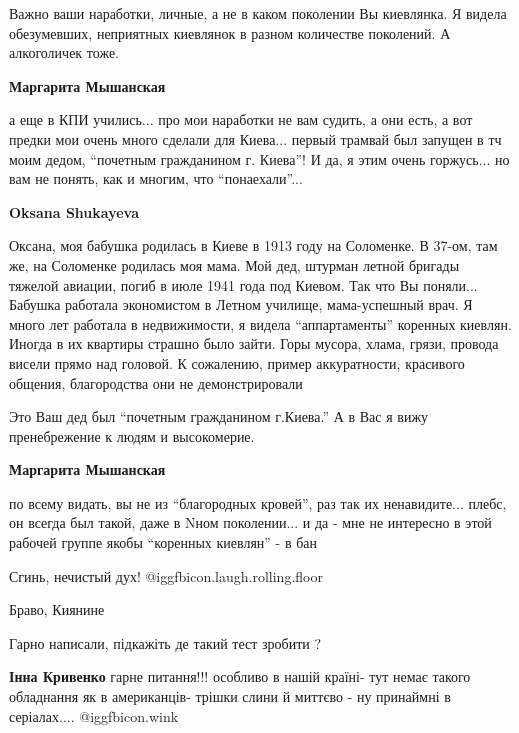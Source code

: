 \begin{itemize}
\begin{itemize}

Важно ваши наработки, личные, а не в каком поколении Вы киевлянка. Я видела
обезумевших, неприятных киевлянок в разном количестве поколений. А алкоголичек
тоже.

\begin{itemize} %
\textbf{Маргарита Мышанская} 

а еще в КПИ учились... про мои наработки не вам судить, а они есть, а вот предки
мои очень много сделали для Киева... первый трамвай был запущен в тч моим
дедом, \enquote{почетным гражданином г. Киева}! И да, я этим очень горжусь... но вам не
понять, как и многим, что \enquote{понаехали}...


\textbf{Oksana Shukayeva} 

Оксана, моя бабушка родилась в Киеве в 1913 году на Соломенке. В 37-ом, там же,
на Соломенке родилась моя мама. Мой дед, штурман летной бригады тяжелой
авиации, погиб в июле 1941 года под Киевом. Так что Вы поняли... Бабушка
работала экономистом в Летном училище, мама-успешный врач. Я много лет работала
в недвижимости, я видела \enquote{аппартаменты} коренных киевлян. Иногда в их
квартиры страшно было зайти. Горы мусора, хлама, грязи, провода висели прямо
над головой. К сожалению, пример аккуратности, красивого общения, благородства
они не демонстрировали


Это Ваш дед был \enquote{почетным гражданином г.Киева.} А в Вас я вижу пренебрежение к людям и высокомерие.

\textbf{Маргарита Мышанская} 

по всему видать, вы не из \enquote{благородных кровей}, раз так их ненавидите... плебс,
он всегда был такой, даже в Nном поколении... и да - мне не интересно в этой
рабочей группе якобы \enquote{коренных киевлян} - в бан

\end{itemize} %

Сгинь, нечистый дух! @igg{fbicon.laugh.rolling.floor} 

\end{itemize} %

Браво, Киянине

Гарно написали, підкажіть де такий тест зробити ?

\begin{itemize} %
\textbf{Інна Кривенко} гарне питання!!! особливо в нашій країні- тут немає такого обладнання як в американців- трішки слини й миттєво - ну принаймні в серіалах.... @igg{fbicon.wink} 


\end{itemize}
\end{itemize}
